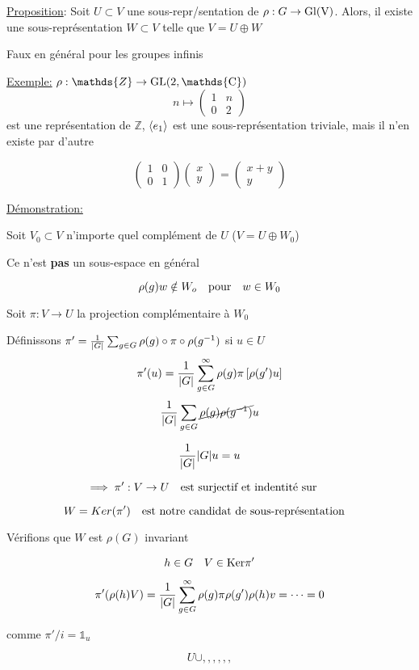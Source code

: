 \underline{Proposition}: Soit $U \subset V$ une sous-repr/sentation de $\rho: G \to \rm{Gl}(V)$. Alors, il existe une sous-représentation $W\subset V$ telle que $V = U \oplus W$  


\begin{tcolorbox}[title=Attention!]
	 
	Faux en général pour les groupes infinis
\end{tcolorbox}


\underline{Exemple:} $\rho: \mathds{Z} \to \rm{GL}(2, \mathds{C})$
\[ n \mapsto \begin{pmatrix} 1 & n \\ 0 & 2 \end{pmatrix}  \]
est une représentation de $\mathds{Z}$, $\expval{e_1}$ est une sous-représentation triviale, mais il n'en existe par d'autre 

\[ \begin{pmatrix} 1 &0 \\ 0 & 1 \end{pmatrix} \begin{pmatrix} x \\ y \end{pmatrix}  = \begin{pmatrix} x+y \\ y \end{pmatrix}   \]

\underline{Démonstration:} 

Soit $V_0 \subset V$ n'importe quel complément de $U$ ($V = U \oplus W_0 $)

Ce n'est \textbf{pas} un sous-espace en général

\[ \rho(g) w \notin W_o  \qq{pour} w \in W_0\]

Soit $\pi: V \to U$ la projection complémentaire à $W_0$

Définissons $\pi' = \frac{1}{\abs{G}} \sum_{g\in G}^{} \rho(g) \circ \pi \circ \rho (g^{-1})$
si $u \in U$
\[ \pi' (u) = \frac{1}{\abs{G}} \sum_{g\in G}^{\infty} \rho(g) \pi \left[ \rho (g') u \right]   \]
\[ \frac{1}{\abs{G}} \sum_{g\in G}^{} \cancel{\rho(g) \rho(g^{-1})} u  \]

 \[ 	\frac{1}{\abs{G}} \abs{G} u = u   \]

 \[ \implies \pi' : V\to U \qq{est surjectif et indentité sur $$} \]

 \[ W = Ker(\pi') \qq{est notre candidat de sous-représentation}\]

Vérifions que $W$ est $\rho(G)$ invariant

\[ h \in G \quad V \in \rm{Ker} \pi' \]

\[ \pi'(\rho(h) V) = \frac{1}{\abs{G}} \sum_{g \in G}^{\infty} \rho(g) \pi \rho(g') \rho(h) v  = \dotsb = 0\]          

comme $\pi'/ i = \mathds{1}_u$

\[ U \cup ,,,,,, \]




